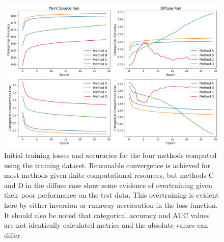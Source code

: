  \begin{figure}[t]
  \centering
  \includegraphics[width=\textwidth]{figures/trainlog.png}
  \caption{Initial training losses and accuracies for the four methods computed using the training dataset. Reasonable convergence is achieved for most methods given finite computational resources, but methods C and D in the diffuse case show some evidence of overtraining given their poor performance on the test data. This overtraining is evident here by either inversion or runaway acceleration in the loss function. It should also be noted that categorical accuracy and AUC values are not identically calculated metrics and the absolute values can differ.
  }
  \label{fig:trainlog}
\end{figure}
